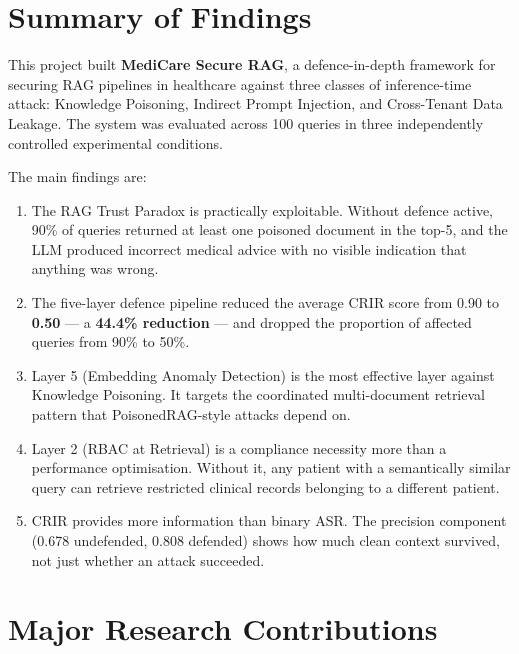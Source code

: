 
\section{Summary of Findings}

This project built \textbf{MediCare Secure RAG}, a defence-in-depth framework for securing RAG pipelines in healthcare against three classes of inference-time attack: Knowledge Poisoning, Indirect Prompt Injection, and Cross-Tenant Data Leakage. The system was evaluated across 100 queries in three independently controlled experimental conditions.

The main findings are:
\begin{enumerate}
    \item The RAG Trust Paradox is practically exploitable. Without defence active, 90\% of queries returned at least one poisoned document in the top-5, and the LLM produced incorrect medical advice with no visible indication that anything was wrong.
    \item The five-layer defence pipeline reduced the average CRIR score from 0.90 to \textbf{0.50} --- a \textbf{44.4\% reduction} --- and dropped the proportion of affected queries from 90\% to 50\%.
    \item Layer 5 (Embedding Anomaly Detection) is the most effective layer against Knowledge Poisoning. It targets the coordinated multi-document retrieval pattern that PoisonedRAG-style attacks depend on.
    \item Layer 2 (RBAC at Retrieval) is a compliance necessity more than a performance optimisation. Without it, any patient with a semantically similar query can retrieve restricted clinical records belonging to a different patient.
    \item CRIR provides more information than binary ASR. The precision component (0.678 undefended, 0.808 defended) shows how much clean context survived, not just whether an attack succeeded.
\end{enumerate}

\section{Major Research Contributions}

